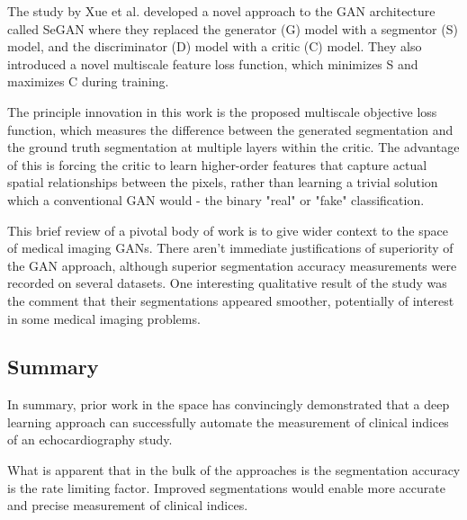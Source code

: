The study by Xue et al. \cite{zhangSegGANSemanticSegmentation2018} developed a
novel approach to the GAN architecture called SeGAN where they replaced the
generator (G) model with a segmentor (S) model, and the discriminator (D) model with a
critic (C) model. They also introduced a novel multiscale feature loss function,
which minimizes S and maximizes C during training.
\newline

The principle innovation in this work is the proposed multiscale objective loss
function, which measures the difference between the generated segmentation and
the ground truth segmentation at multiple layers within the critic. The
advantage of this is forcing the critic to learn higher-order features that
capture actual spatial relationships between the pixels, rather than learning a
trivial solution which a conventional GAN would - the binary "real" or "fake"
classification. \newline

This brief review of a pivotal body of work is to give wider context to the
space of medical imaging GANs. There aren't immediate justifications of
superiority of the GAN approach, although superior segmentation accuracy
measurements were recorded on several datasets. One interesting qualitative
result of the study was the comment that their segmentations appeared smoother,
potentially of interest in some medical imaging problems. \newline

\subsection{Summary}

In summary, prior work in the space has convincingly demonstrated that a deep
learning approach can successfully automate the measurement of clinical indices
of an echocardiography study. \newline

What is apparent that in the bulk of the approaches is the segmentation accuracy
is the rate limiting factor. Improved segmentations would enable more accurate
and precise measurement of clinical indices. \newline